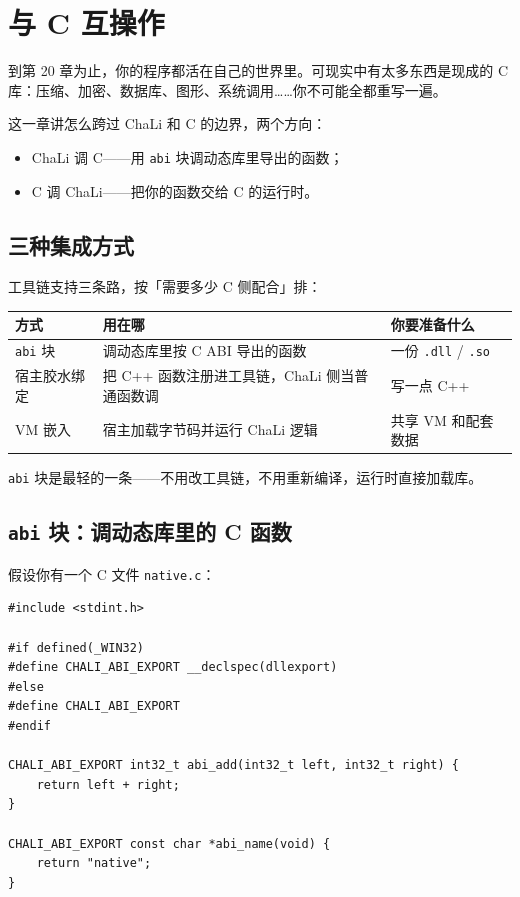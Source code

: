 \chapter{与 C 互操作}
\label{ch:21}

到第 20 章为止，你的程序都活在自己的世界里。可现实中有太多东西是现成的 C 库：压缩、加密、数据库、图形、系统调用……你不可能全都重写一遍。

这一章讲怎么跨过 ChaLi 和 C 的边界，两个方向：

\begin{itemize}

\item ChaLi 调 C——用 \texttt{abi} 块调动态库里导出的函数；

\item C 调 ChaLi——把你的函数交给 C 的运行时。

\end{itemize}

\section{三种集成方式}

工具链支持三条路，按「需要多少 C 侧配合」排：

\begin{center}
\begin{tabular}{lll}
\toprule
方式 & 用在哪 & 你要准备什么 \\
\midrule
\texttt{abi} 块 & 调动态库里按 C ABI 导出的函数 & 一份 \texttt{.\allowbreak{}dll} / \texttt{.\allowbreak{}so} \\
宿主胶水绑定 & 把 C++ 函数注册进工具链，ChaLi 侧当普通函数调 & 写一点 C++ \\
VM 嵌入 & 宿主加载字节码并运行 ChaLi 逻辑 & 共享 VM 和配套数据 \\
\bottomrule
\end{tabular}
\end{center}

\texttt{abi} 块是最轻的一条——不用改工具链，不用重新编译，运行时直接加载库。

\section{\texttt{abi} 块：调动态库里的 C 函数}

假设你有一个 C 文件 \texttt{native.\allowbreak{}c}：

\par
\medskip
\begin{lstlisting}[style=c]
#include <stdint.h>

#if defined(_WIN32)
#define CHALI_ABI_EXPORT __declspec(dllexport)
#else
#define CHALI_ABI_EXPORT
#endif

CHALI_ABI_EXPORT int32_t abi_add(int32_t left, int32_t right) {
    return left + right;
}

CHALI_ABI_EXPORT const char *abi_name(void) {
    return "native";
}
\end{lstlisting}
\par
\medskip

